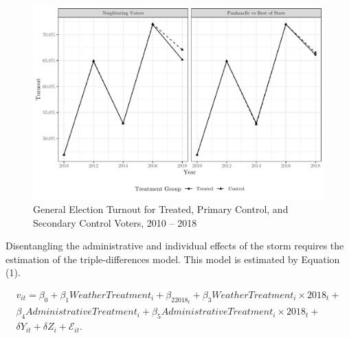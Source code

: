 \documentclass[
  12pt,
]{article}
\begin{document}
\begin{figure}[h]

{\centering \includegraphics{hurricane_michael_files/figure-latex/tripd-to-chunk-1} 

}

\caption{\label{fig:trip-diff-plot}General Election Turnout for Treated, Primary Control, and Secondary Control Voters, 2010 -- 2018}\label{fig:tripd-to-chunk}
\end{figure}

Disentangling the administrative and individual effects of the storm requires the estimation of the triple-differences model. This model is estimated by Equation (1).

\begin{gather}
\label{eq:1}
v_{it}=\beta_0+\beta_1Weather Treatment_{i}+\beta_22018_{t}+\beta_3Weather Treatment_{i}\times 2018_{t} + \nonumber \\
\beta_4Administrative Treatment_{i} + \beta_5Administrative Treatment_{i}\times 2018_{t} + \\
\delta{Y}_{it} + \delta{Z}_{i} + \mathcal{E}_{it}. \nonumber
\end{gather}
\end{document}
